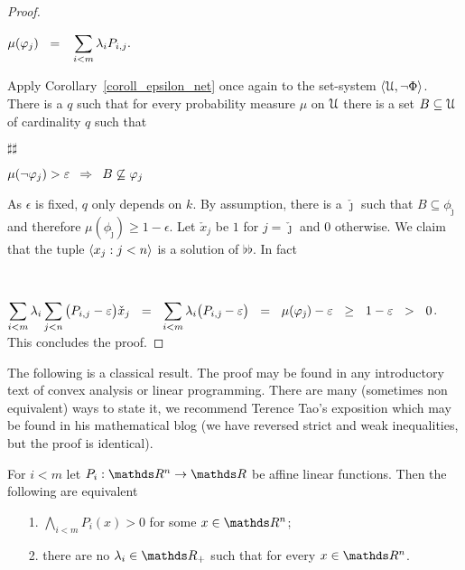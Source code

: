 \documentclass[combinatorics.tex]{subfiles}
\begin{document}
\begin{proof}
\parbox{10ex}{~}
$\displaystyle\mu(\phi_j)\medrel{=}\sum_{i<m}\lambda_i P_{i,j}.$

Apply Corollary~\ref{coroll_epsilon_net} once again to the set-system $\langle\EuScript U,\neg\Phi\rangle$.
There is a $q$ such that for every probability measure $\mu$ on $\EuScript U$ there is a set $B\subseteq\EuScript U$ of cardinality $q$ such that

\parbox{10ex}{$\sharp\sharp$}
$\displaystyle\mu(\neg\phi_j)>\epsilon\medrel{\IMP}B\not\subseteq\phi_j$

As $\epsilon$ is fixed, $q$ only depends on $k$.
By assumption, there is a $\check\jmath$ such that $B\subseteq\phi_{\check\jmath}$ and therefore $\mu(\phi_{\check\jmath})\ge1-\epsilon$.
Let $\check x_j$ be $1$ for $j=\check\jmath$ and $0$ otherwise.
We claim that the tuple $\langle x_j:j<n\rangle$ is a solution of $\flat\flat$.
In fact

\parbox{10ex}{~}
$\displaystyle\sum_{i<m}\lambda_i\sum_{j<n}\big(P_{i,j}-\epsilon\big)\check x_j\medrel{=}{\sum_{i<m}\lambda_i\big(P_{i,\check\jmath}-\epsilon\big)}\medrel{=}\mu(\phi_{\check\jmath})-\epsilon\medrel{\ge}1-\epsilon\medrel{>}0$.
This concludes the proof.
\end{proof}

The following is a classical result.
The proof may be found in any introductory text of convex analysis or linear programming.
There are many (sometimes non equivalent) ways to state it, we recommend  Terence Tao's exposition which may be found in his mathematical blog (we have reversed strict and weak inequalities, but the proof is identical).

\begin{proposition}
For $i<m$ let $P_i:\RR^n\to\RR$ be affine linear functions.
Then the following are equivalent\nobreak  
\begin{itemize}
\item[1.] $\displaystyle\bigwedge_{i<m}P_i(x)> 0$ for some $x\in\RR^n$;
\item[2.] there are no $\lambda_i\in\RR_+$ such that  for every $x\in\RR^n$.\QED
\end{itemize}
\end{proposition}
\end{document}
